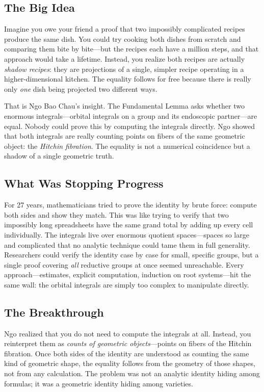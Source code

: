 \subsection{The Big Idea}

Imagine you owe your friend a proof that two impossibly complicated recipes produce the same dish. You could try cooking both dishes from scratch and comparing them bite by bite---but the recipes each have a million steps, and that approach would take a lifetime. Instead, you realize both recipes are actually \emph{shadow recipes}: they are projections of a single, simpler recipe operating in a higher-dimensional kitchen. The equality follows for free because there is really only \emph{one} dish being projected two different ways.

That is Ngo Bao Chau's insight. The Fundamental Lemma asks whether two enormous integrals---orbital integrals on a group and its endoscopic partner---are equal. Nobody could prove this by computing the integrals directly. Ngo showed that both integrals are really counting points on fibers of the same geometric object: the \emph{Hitchin fibration}. The equality is not a numerical coincidence but a shadow of a single geometric truth.

\subsection{What Was Stopping Progress}

For 27 years, mathematicians tried to prove the identity by brute force: compute both sides and show they match. This was like trying to verify that two impossibly long spreadsheets have the same grand total by adding up every cell individually. The integrals live over enormous quotient spaces---spaces so large and complicated that no analytic technique could tame them in full generality. Researchers could verify the identity case by case for small, specific groups, but a single proof covering \emph{all} reductive groups at once seemed unreachable. Every approach---estimates, explicit computation, induction on root systems---hit the same wall: the orbital integrals are simply too complex to manipulate directly.

\subsection{The Breakthrough}

Ngo realized that you do not need to compute the integrals at all. Instead, you reinterpret them as \emph{counts of geometric objects}---points on fibers of the Hitchin fibration. Once both sides of the identity are understood as counting the same kind of geometric shape, the equality follows from the geometry of those shapes, not from any calculation. The problem was not an analytic identity hiding among formulas; it was a geometric identity hiding among varieties.

